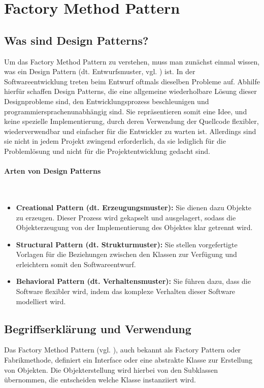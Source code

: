 \section{Factory Method Pattern}
\subsection{Was sind Design Patterns?}
Um das Factory Method Pattern zu verstehen, muss man zunächst einmal wissen, was ein Design Pattern (dt. Entwurfsmuster, vgl. \cite{design_pattern_2020}) ist. In der Softwareentwicklung treten beim Entwurf oftmals dieselben Probleme auf. Abhilfe hierfür schaffen Design Patterns, die eine allgemeine wiederholbare Lösung dieser Designprobleme sind, den Entwicklungsprozess beschleunigen und programmiersprachenunabhängig sind. Sie repräsentieren somit eine Idee, und keine spezielle Implementierung, durch deren Verwendung der Quellcode flexibler, wiederverwendbar und einfacher für die Entwickler zu warten ist. Allerdings sind sie nicht in jedem Projekt zwingend erforderlich, da sie lediglich für die Problemlösung und nicht für die Projektentwicklung gedacht sind.

\paragraph{Arten von Design Patterns}\mbox{}\\

\begin{itemize}
	\item \textbf{Creational Pattern (dt. Erzeugungsmuster):} Sie dienen dazu Objekte zu erzeugen. Dieser Prozess wird gekapselt und ausgelagert, sodass die Objekterzeugung von der Implementierung des Objektes klar getrennt wird.
	\item \textbf{Structural Pattern (dt. Strukturmuster):} Sie stellen vorgefertigte Vorlagen für die Beziehungen zwischen den Klassen zur Verfügung und erleichtern somit den Softwareentwurf.
	\item \textbf{Behavioral Pattern (dt. Verhaltensmuster):} Sie führen dazu, dass die Software flexibler wird, indem das komplexe Verhalten dieser Software modelliert wird.
\end{itemize}

\subsection{Begriffserklärung und Verwendung}
Das Factory Method Pattern (vgl. \cite{factory_method_2020}), auch bekannt als Factory Pattern oder Fabrikmethode, definiert ein Interface oder eine abstrakte Klasse zur Erstellung von Objekten. Die Objekterstellung wird hierbei von den Subklassen übernommen, die entscheiden welche Klasse instanziiert wird.

